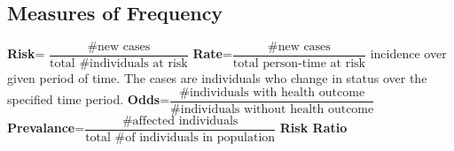 \documentclass{article}
\begin{document}
\begin{flushleft}
\section*{Measures of Frequency}
\textbf{Risk}= $\dfrac{\text{\# new cases}}{\text{total \# individuals at risk}}$ \medbreak
\textbf{Rate}=$\dfrac{\text{\# new cases}}{\text{total person-time at risk}}$\medbreak
incidence over given period of time. The cases are individuals who change in status over the specified time period.\medbreak
\textbf{Odds}=$\dfrac{\text{\# individuals with health outcome}}{\text{\# individuals without health outcome}}$\medbreak
\textbf{Prevalance}=$\dfrac{\text{\# affected individuals}}{\text{total \# of individuals in population}}$\medbreak
\textbf{Risk Ratio}




\end{flushleft}
\end{document}
